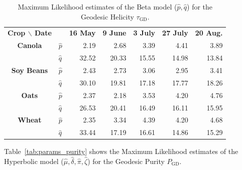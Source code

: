 \documentclass[journal]{IEEEtran}
\begin{document}
{\begin{table}[hbt]
	\centering
	\caption{Maximum Likelihood estimates of the Beta model ($\widehat p,\widehat q$) for the Geodesic Helicity $\tau_{\text{GD}}$.}
	\label{tab:params_helicity}
	\setlength{\tabcolsep}{3.8pt}
	\begin{tabular}{clrrrrr}
		\toprule
		\textbf{Crop $\backslash$ Date} & & \textbf{16 May} & \textbf{9 June} & \textbf{3 July} & \textbf{27 July} & \textbf{20 Aug.}\\ \cmidrule{1-2} \cmidrule(lr){3-3} \cmidrule(lr){4-4} \cmidrule(lr){5-5} \cmidrule(lr){6-6} \cmidrule(lr){7-7}
		\textbf{Canola}     
		& $\widehat{p}$ & 2.19      & 2.68    & 3.39     & 4.41      & 3.89 \\
		& $\widehat{q}$ & 32.52     & 20.33     & 15.55  & 14.98     & 13.84\\ 
		\midrule
		\textbf{Soy Beans}
		& $\widehat{p}$ & 2.43       & 2.73       & 3.06       & 2.95       & 3.41 \\
		& $\widehat{q}$ & 30.10   & 19.81   & 17.18   & 17.77   & 18.26\\ 
		\midrule
		\textbf{Oats}
		& $\widehat{p}$ & 2.37       & 2.18      & 3.53     & 4.20     & 4.76 \\
		& $\widehat{q}$ & 26.53    & 20.41   & 16.49     & 16.11      & 15.95 \\ 
		\midrule
		\textbf{Wheat} 
		& $\widehat{p}$ & 2.35      & 3.34      & 4.39     & 4.20      & 4.68   \\
		& $\widehat{q}$ & 33.44   & 17.19   & 16.61   & 14.86   & 15.29   \\
		\bottomrule
	\end{tabular}
\end{table}

Table~\ref{tab:params_purity} shows the Maximum Likelihood estimates of the Hyperbolic model ($\widehat \mu,\widehat \delta, \widehat \pi, \widehat \zeta$) for the Geodesic Purity $P_{\text{GD}}$.

}
\end{document}

